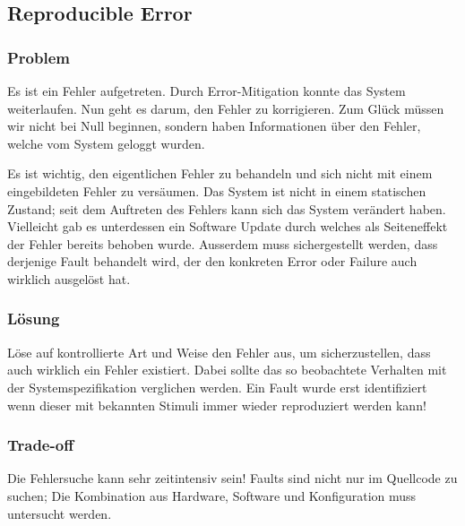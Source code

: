 \subsection{Reproducible Error}


\subsubsection*{Problem}


Es ist ein Fehler aufgetreten. Durch Error-Mitigation konnte das System weiterlaufen. Nun geht es darum, den Fehler zu korrigieren. Zum Glück müssen wir nicht bei Null beginnen, sondern haben Informationen über den Fehler, welche vom System geloggt wurden.

Es ist wichtig, den eigentlichen Fehler zu behandeln und sich nicht mit einem eingebildeten Fehler zu versäumen. Das System ist nicht in einem statischen Zustand; seit dem Auftreten des Fehlers kann sich das System verändert haben. Vielleicht gab es unterdessen ein Software Update durch welches als Seiteneffekt der Fehler bereits behoben wurde.
Ausserdem muss sichergestellt werden, dass derjenige Fault behandelt wird, der den konkreten Error oder Failure auch wirklich ausgelöst hat.

\subsubsection*{Lösung}


Löse auf kontrollierte Art und Weise den Fehler aus, um sicherzustellen, dass auch wirklich ein Fehler existiert. Dabei sollte das so beobachtete Verhalten mit der Systemspezifikation verglichen werden. Ein Fault wurde erst identifiziert wenn dieser mit bekannten Stimuli immer wieder reproduziert werden kann!

\subsubsection*{Trade-off}


Die Fehlersuche kann sehr zeitintensiv sein! Faults sind nicht nur im Quellcode zu suchen; Die Kombination aus Hardware, Software und Konfiguration muss untersucht werden.

